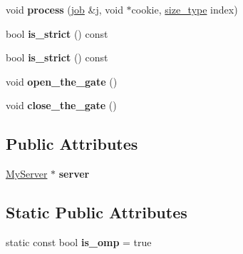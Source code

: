 \begin{DoxyCompactItemize}
\item 
\hypertarget{classMyClient_a1cdac0a2f851a33a06dcfec12bc0e6fa}{}void {\bfseries process} (\hyperlink{classrml_1_1client_a684e4fee23d24f9d9d150eb38f2d254f}{job} \&j, void $\ast$cookie, \hyperlink{classrml_1_1client_a0dc06ede570f7ee6d3021862cb71119f}{size\+\_\+type} index)\label{classMyClient_a1cdac0a2f851a33a06dcfec12bc0e6fa}

\item 
\hypertarget{classMyClient_aed2edbd60b5cb204570d7ae0d44dcf03}{}bool {\bfseries is\+\_\+strict} () const \label{classMyClient_aed2edbd60b5cb204570d7ae0d44dcf03}

\item 
\hypertarget{classMyClient_aed2edbd60b5cb204570d7ae0d44dcf03}{}bool {\bfseries is\+\_\+strict} () const \label{classMyClient_aed2edbd60b5cb204570d7ae0d44dcf03}

\item 
\hypertarget{classMyClient_aefc683e3347ff6ffc1fb371edc78f2f8}{}void {\bfseries open\+\_\+the\+\_\+gate} ()\label{classMyClient_aefc683e3347ff6ffc1fb371edc78f2f8}

\item 
\hypertarget{classMyClient_ac097925832e3a8b297377b55e079fa8d}{}void {\bfseries close\+\_\+the\+\_\+gate} ()\label{classMyClient_ac097925832e3a8b297377b55e079fa8d}

\end{DoxyCompactItemize}
\subsection*{Public Attributes}
\begin{DoxyCompactItemize}
\item 
\hypertarget{classMyClient_aa9b2e7cfcec0544ddbc7565a57d15007}{}\hyperlink{class____kmp_1_1rml_1_1omp__server}{My\+Server} $\ast$ {\bfseries server}\label{classMyClient_aa9b2e7cfcec0544ddbc7565a57d15007}

\end{DoxyCompactItemize}
\subsection*{Static Public Attributes}
\begin{DoxyCompactItemize}
\item 
\hypertarget{classMyClient_ac1735fb1daa7132a2d7805c0e85ef90d}{}static const bool {\bfseries is\+\_\+omp} = true\label{classMyClient_ac1735fb1daa7132a2d7805c0e85ef90d}

\end{DoxyCompactItemize}
